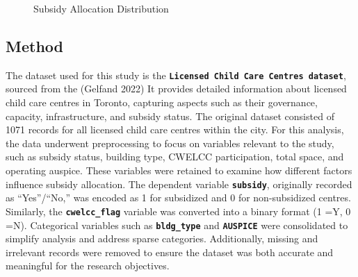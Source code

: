 \documentclass[
  letterpaper,
  DIV=11,
  numbers=noendperiod]{scrartcl}
\begin{document}
\begin{figure}


\caption{\label{fig-subsidy}Subsidy Allocation Distribution}

\end{figure}%

\subsection{Method}\label{method}

The dataset used for this study is the
\textbf{\texttt{Licensed\ Child\ Care\ Centres\ dataset}}, sourced from
the (Gelfand 2022) It provides detailed information about licensed child
care centres in Toronto, capturing aspects such as their governance,
capacity, infrastructure, and subsidy status. The original dataset
consisted of 1071 records for all licensed child care centres within the
city. For this analysis, the data underwent preprocessing to focus on
variables relevant to the study, such as subsidy status, building type,
CWELCC participation, total space, and operating auspice. These
variables were retained to examine how different factors influence
subsidy allocation. The dependent variable \textbf{\texttt{subsidy}},
originally recorded as ``Yes''/``No,'' was encoded as 1 for subsidized
and 0 for non-subsidized centres. Similarly, the
\textbf{\texttt{cwelcc\_flag}} variable was converted into a binary
format (1 =Y, 0 =N). Categorical variables such as
\textbf{\texttt{bldg\_type}} and \textbf{\texttt{AUSPICE}} were
consolidated to simplify analysis and address sparse categories.
Additionally, missing and irrelevant records were removed to ensure the
dataset was both accurate and meaningful for the research objectives.
\end{document}
